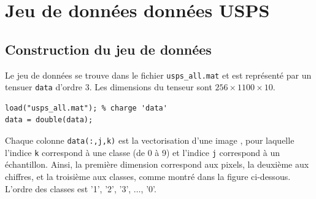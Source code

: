 \section{Jeu de données données USPS}


\subsection{Construction du jeu de données}
Le jeu de données se trouve dans le fichier \texttt{usps\_all.mat} et est représenté par un tensuer \texttt{data} d'ordre $3$. Les dimensions du tenseur sont $256\times 1100 \times 10$.

\begin{lstlisting}
load("usps_all.mat"); % charge 'data'
data = double(data);
\end{lstlisting}

Chaque colonne \texttt{data(:,j,k)} est la vectorisation d'une image , pour laquelle l'indice \texttt{k} correspond à une classe (de 0 à 9) et l'indice \texttt{j} correspond à un échantillon. Ainsi, la première dimension correspond aux pixels, la deuxième aux chiffres, et la troisième aux classes, comme montré dans la figure ci-dessous. L'ordre des classes est '1', '2', '3', $\ldots$, '0'.

\begin{center}
\end{center}


